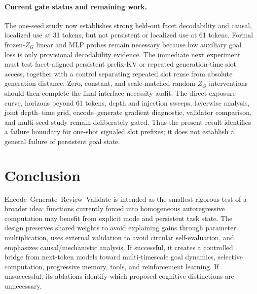 \documentclass[11pt]{article}
\begin{document}
\paragraph{Current gate status and remaining work.}
The one-seed study now establishes strong held-out facet decodability and causal, localized use at 31 tokens, but not persistent or localized use at 61 tokens. Formal frozen-$Z_G$ linear and MLP probes remain necessary because low auxiliary goal loss is only provisional decodability evidence. The immediate next experiment must test facet-aligned persistent prefix-KV or repeated generation-time slot access, together with a control separating repeated slot reuse from absolute generation distance. Zero, constant, and scale-matched random-$Z_G$ interventions should then complete the final-interface necessity audit. The direct-exposure curve, horizons beyond 61 tokens, depth and injection sweeps, layerwise analysis, joint depth--time grid, encode--generate gradient diagnostic, validator comparison, and multi-seed study remain deliberately gated. Thus the present result identifies a failure boundary for one-shot signaled slot prefixes; it does not establish a general failure of persistent goal state.

\section{Conclusion}
Encode--Generate--Review--Validate is intended as the smallest rigorous test of a broader idea: functions currently forced into homogeneous autoregressive computation may benefit from explicit mode and persistent task state. The design preserves shared weights to avoid explaining gains through parameter multiplication, uses external validation to avoid circular self-evaluation, and emphasizes causal/mechanistic analysis. If successful, it creates a controlled bridge from next-token models toward multi-timescale goal dynamics, selective computation, progressive memory, tools, and reinforcement learning. If unsuccessful, its ablations identify which proposed cognitive distinctions are unnecessary.


\end{document}
